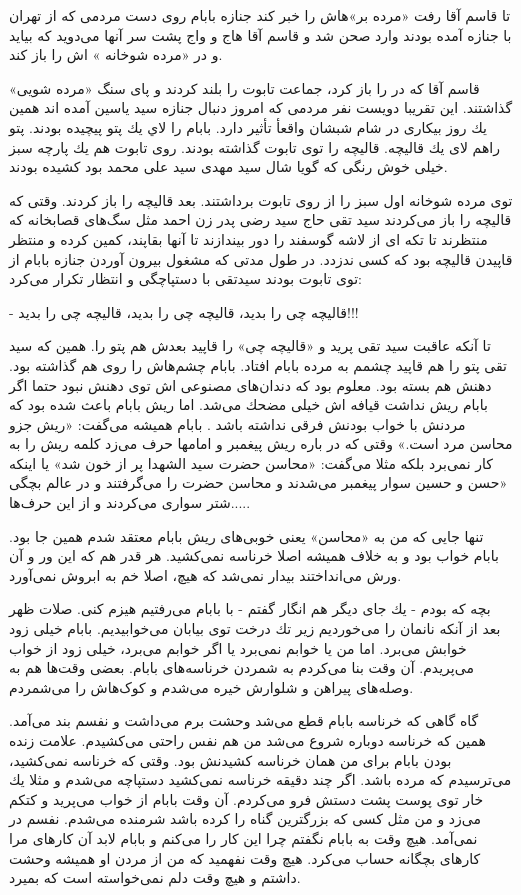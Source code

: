 \documentclass[12pt,a4paper]{book}
\begin{document}
تا قاسم آقا رفت «مرده بر»‌هاش را خبر کند جنازه
بابام روی دست مردمی که از تهران با جنازه آمده بودند وارد صحن شد و قاسم آقا هاج و واج پشت سر آنها می‌دوید که بیاید و در «مرده شوخانه » اش را باز کند.

قاسم آقا که در را باز کرد، جماعت تابوت را بلند کردند و پای سنگ «مرده شویی» گذاشتند. این تقريبا دویست نفر مردمی که امروز دنبال جنازه سید یاسین آمده اند همين يك روز بیکاری در شام شبشان واقعأ تأثیر دارد.
بابام را لاي يك پتو پیچیده بودند. پتو راهم لای يك قالیچه. قالیچه را توی تابوت گذاشته بودند. روی تابوت هم يك پارچه سبز خیلی خوش رنگی که گویا شال سید مهدی سید علی محمد بود کشیده بودند.

توی مرده شوخانه اول سبز را از روی تابوت برداشتند. بعد قالیچه را باز کردند. وقتی که قالیچه را باز می‌کردند سید تقی حاج سید رضی پدر زن احمد مثل سگ‌های قصابخانه که منتظرند تا تکه ای از لاشه گوسفند را دور بیندازند تا آنها بقاپند، کمین کرده و منتظر قاپیدن قاليچه بود که کسی ندزدد. در طول مدتی که مشغول بيرون آوردن جنازه بابام از توی تابوت بودند سیدتقی با دستپاچگی و انتظار تکرار می‌کرد:

- قالیچه چی را بدید، قالیچه چی را بدید، قاليچه چی را بدید!!!

تا آنکه عاقبت سید تقی پرید و «قالیچه چی» را قاپید بعدش هم پتو را. همین که سید تقی پتو را هم قاپید چشمم به مرده بابام افتاد. بابام چشم‌هاش را روی هم گذاشته بود. دهنش هم بسته بود. معلوم بود که دندان‌های مصنوعی اش توی دهنش نبود حتما اگر بابام ریش نداشت قیافه اش خیلی مضحك می‌شد. اما ریش بابام باعث شده بود که مردنش با خواب بودنش فرقی نداشته باشد . بابام همیشه می‌گفت: «ريش جزو محاسن مرد است.» وقتی که در باره ریش پیغمبر و امامها حرف می‌زد کلمه ریش را به کار نمی‌برد بلکه مثلا می‌گفت: «محاسن حضرت سید الشهدا پر از خون شد» یا اینکه «حسن و حسین سوار پیغمبر می‌شدند و محاسن حضرت را می‌گرفتند و در عالم بچگی شتر سواری می‌کردند و از این حرف‌ها.....

تنها جایی که من به «محاسن» یعنی خوبی‌های ریش بابام معتقد شدم همین جا بود. بابام خواب بود و به خلاف همیشه اصلا خرناسه نمی‌کشید. هر قدر هم که این ور و آن ورش می‌انداختند بیدار نمی‌شد که هیچ، اصلا خم به
ابروش نمی‌آورد.

بچه که بودم - يك جای دیگر هم انگار گفتم - با بابام می‌رفتیم هیزم کنی. صلات ظهر بعد از آنکه نانمان را می‌خوردیم زیر تك درخت توی بیابان می‌خوابیدیم. بابام خیلی زود خوابش می‌برد. اما من یا خوابم نمی‌برد یا اگر خوابم می‌برد، خیلی زود از خواب می‌پریدم. آن وقت بنا می‌کردم به شمردن خرناسه‌های بابام. بعضی وقت‌ها هم به وصله‌های پیراهن و شلوارش خیره می‌شدم و کوک‌هاش را می‌شمردم.

گاه گاهی که خرناسه بابام قطع می‌شد وحشت برم می‌داشت و نفسم بند می‌آمد. همین که خرناسه دوباره شروع می‌شد من هم نفس راحتی می‌کشیدم. علامت زنده بودن بابام برای من همان خرناسه کشیدنش بود. وقتی که خرناسه نمی‌کشید، می‌ترسیدم که مرده باشد. اگر چند دقیقه خرناسه نمی‌کشید دستپاچه می‌شدم و مثلا يك خار توی پوست پشت دستش فرو می‌کردم. آن وقت بابام از خواب می‌پرید و کتکم می‌زد و من مثل کسی که بزرگترین گناه را کرده باشد شرمنده می‌شدم. نفسم در نمی‌آمد. هیچ وقت به بابام نگفتم چرا این کار را می‌کنم و بابام لابد آن کارهای مرا کارهای بچگانه حساب می‌کرد. هیچ وقت نفهمید که من از مردن او همیشه وحشت داشتم و هیچ وقت دلم نمی‌خواسته است که بمیرد.
\end{document}
